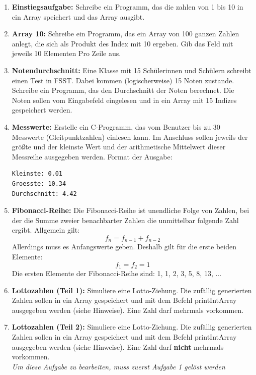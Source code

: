 \begin{enumerate}
\item \textbf{Einstiegsaufgabe:} Schreibe ein Programm, das die zahlen von 1 bis 10 in ein Array speichert und das Array ausgibt. 

\item \textbf{Array 10:} Schreibe ein Programm, das ein Array von 100 ganzen Zahlen anlegt, die sich als Produkt des Index mit 10 ergeben. Gib das Feld mit jeweils 10 Elementen Pro Zeile aus.

\item \textbf{Notendurchschnitt:} Eine Klasse mit 15 Schülerinnen und Schülern schreibt einen Test in FSST. Dabei kommen (logischerweise) 15 Noten zustande. Schreibe ein Programm, das den Durchschnitt der Noten berechnet. Die Noten sollen vom Eingabefeld eingelesen und in ein Array mit 15 Indizes gespeichert werden.

\item \textbf{Messwerte:} Erstelle ein C-Programm, das vom Benutzer bis zu 30 Messwerte (Gleitpunktzahlen) einlesen kann. Im Anschluss sollen jeweils der größte und der kleinste Wert und der arithmetische Mittelwert dieser Messreihe ausgegeben werden. Format der Ausgabe:
\begin{lstlisting}
Kleinste: 0.01
Groesste: 10.34
Durchschnitt: 4.42
\end{lstlisting}

\item \textbf{Fibonacci-Reihe:} Die Fibonacci-Reihe ist unendliche Folge von Zahlen, bei der die Summe zweier benachbarter Zahlen die unmittelbar folgende Zahl ergibt. Allgemein gilt:
\begin{equation}
f_n = f_{n-1} + f_{n-2}
\end{equation}
Allerdings muss es Anfangswerte geben. Deshalb gilt für die erste beiden Elemente:
\begin{equation}
f_1 = f_2 = 1
\end{equation}
Die ersten Elemente der Fibonacci-Reihe sind: 1, 1, 2, 3, 5, 8, 13, ... 

\item \textbf{Lottozahlen (Teil 1):} Simuliere eine Lotto-Ziehung. Die zufällig generierten Zahlen sollen in ein Array gespeichert und mit dem Befehl printIntArray ausgegeben werden (siehe Hinweise). Eine Zahl darf mehrmals vorkommen.

\item \textbf{Lottozahlen (Teil 2):} Simuliere eine Lotto-Ziehung. Die zufällig generierten Zahlen sollen in ein Array gespeichert und mit dem Befehl printIntArray ausgegeben werden (siehe Hinweise). Eine Zahl darf \textbf{nicht} mehrmals vorkommen.\\
\emph{Um diese Aufgabe zu bearbeiten, muss zuerst Aufgabe 1 gelöst werden}
\end{enumerate}

